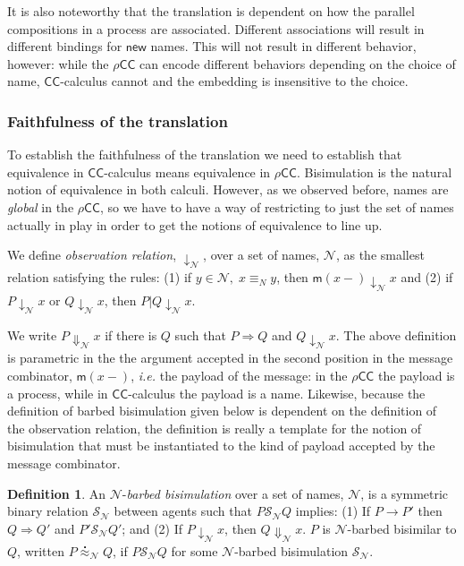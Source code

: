 \documentclass[submission,copyright,creativecommons]{eptcs}
\newcommand{\new}{\mathsf{new}}
\newcommand{\ccomb}{$\mathsf{CC}$-calculus}
\newcommand{\wbbisim}{\stackrel{\centerdot}{\approx}} %
\newcommand{\nameeq}{\mathbin{\equiv_N}}
\newcommand{\binpar}[2]{#1 | #2}
\newcommand{\prefix}[3]{\mathsf{for}(#2 \leftarrow #1) #3}
\newcommand{\red}{\rightarrow}
\newcommand{\wred}{\Rightarrow}
\newcommand{\rhoc}{$\rho$-calculus}
\newcommand{\rhocc}{$\rho$$\mathsf{CC}$}
\theoremstyle{definition}
\newtheorem{definition}{Definition}
\theoremstyle{remark}
\theoremstyle{remark}
\begin{document}
It is also noteworthy that the translation is dependent on how the
parallel compositions in a process are associated. Different
associations will result in different bindings for $\new$
names. This will not result in different behavior, however:
while the {\rhocc} can encode different behaviors depending
on the choice of name, {\ccomb} cannot and the
embedding is insensitive to the choice.

\subsubsection{Faithfulness of the translation}
To establish the faithfulness of the translation we need to establish
that equivalence in {\ccomb} means equivalence in
{\rhocc}. Bisimulation is the natural notion of equivalence in both
calculi. However, as we observed before, names are \emph{global} in
the {\rhocc}, so we have to have a way of restricting to just the set
of names actually in play in order to get the notions of equivalence
to line up.

We define \emph{observation relation}, $\downarrow_{\mathcal{N}}$, over a set
of names, $\mathcal N$, as the smallest relation satisfying the rules:
(1) if $y \in {\mathcal N}, \; x \nameeq y$, then
$\mathsf{m}(x-) \downarrow_{\mathcal{N}} x$
and
(2) if 
$P\downarrow_{\mathcal{N}} x$ or $Q\downarrow_{\mathcal N} x$, 
then ${\binpar{P}{Q} \downarrow_{\mathcal{N}} x}$.

We write $P \Downarrow_{\mathcal{N}} x$ if there is $Q$ such that 
$P \wred Q$ and $Q \downarrow_{\mathcal{N}} x$.
The above definition is parametric in the the argument accepted in the
second position in the message combinator, $\mathsf{m}(x-)$, {\em i.e.} the payload
of the message: in the {\rhocc} the payload is a process,
while in {\ccomb} the payload is a name. Likewise, because the
definition of barbed bisimulation given below is dependent on the
definition of the observation relation, the definition is really a
template for the notion of bisimulation that must be instantiated to
the kind of payload accepted by the message combinator.


\begin{definition}
An  ${\mathcal N}$-\emph{barbed bisimulation} over a set of names, ${\mathcal N}$, is a symmetric binary relation 
${\mathcal S}_{\mathcal N}$ between agents such that $P{\mathcal S}_{\mathcal N}Q$ implies:
(1) If $P \red P'$ then $Q \wred Q'$ and $P'{\mathcal S}_{\mathcal N}
Q'$; and 
 (2) If $P\downarrow_{\mathcal N} x$, then $Q\Downarrow_{\mathcal N} x$.
$P$ is ${\mathcal N}$-barbed bisimilar to $Q$, written
$P \wbbisim_{\mathcal N} Q$, if $P {\mathcal S}_{\mathcal N} Q$ for some ${\mathcal N}$-barbed bisimulation ${\mathcal S}_{\mathcal N}$.
\end{definition}
\end{document}
